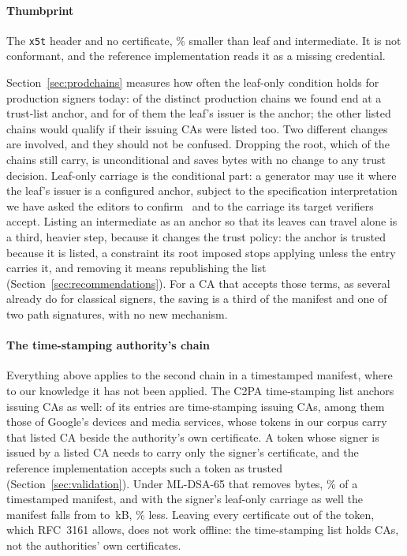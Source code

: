 \paragraph{Thumbprint} The \texttt{x5t} header and no certificate,
\NsaveThumbDSAsixtyfive\% smaller than leaf and intermediate. It is not
conformant, and the reference implementation reads it as a missing
credential.

Section~\ref{sec:prodchains} measures how often the leaf-only
condition holds for production signers today: \NcorpProdListed{} of the
\NcorpProdChains{} distinct production chains we found end at a trust-list
anchor, and for \NcorpProdIssuer{} of them the leaf's issuer is the anchor;
the other listed chains would qualify if their issuing CAs were listed too.
Two different changes are involved, and they should not be confused. Dropping
the root, which \NcorpProdRoot{} of the \NcorpProdChains{} chains still carry,
is unconditional and saves bytes with no change to any trust decision. Leaf-only
carriage is the conditional part: a generator may use it where the leaf's
issuer is a configured anchor, subject to the specification interpretation we
have asked the editors to confirm~\cite{c2paspec142} and to the carriage its
target verifiers accept. Listing an intermediate as an anchor so that its
leaves can travel alone is a third, heavier step, because it changes the trust
policy: the anchor is trusted because it is listed, a constraint its root
imposed stops applying unless the entry carries it, and removing it means
republishing the list (Section~\ref{sec:recommendations}). For a CA that
accepts those terms, as several already do for classical signers, the saving is
a third of the manifest and one of two path signatures, with no new mechanism.

\paragraph{The time-stamping authority's chain} Everything above applies to
the second chain in a timestamped manifest, where to our knowledge it has not
been applied.
The C2PA time-stamping list anchors issuing CAs as well: \NtsaIssuing{} of its
\NtsaAnchors{} entries are time-stamping issuing CAs, among them those of
Google's devices and media services, whose tokens in our corpus carry that
listed CA beside the authority's own certificate. A token whose signer is
issued by a listed CA needs to carry only the signer's certificate, and the
reference implementation accepts such a token as trusted
(Section~\ref{sec:validation}). Under ML-DSA-65 that removes
\NtsaLeafSaveB{} bytes, \NtsaLeafSavePct\% of a timestamped manifest, and
with the signer's leaf-only carriage as well the manifest falls from
\NtsTstkBDSAsixtyfive{} to \NtsBothLeafkB\,kB, \NtsBothLeafPct\% less. Leaving
every certificate out of the token, which RFC~3161 allows, does not work
offline: the time-stamping list holds CAs, not the authorities' own
certificates.

